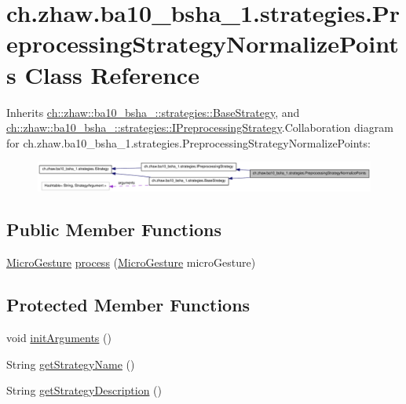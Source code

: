 \hypertarget{classch_1_1zhaw_1_1ba10__bsha__1_1_1strategies_1_1PreprocessingStrategyNormalizePoints}{
\section{ch.zhaw.ba10\_\-bsha\_\-1.strategies.PreprocessingStrategyNormalizePoints Class Reference}
\label{classch_1_1zhaw_1_1ba10__bsha__1_1_1strategies_1_1PreprocessingStrategyNormalizePoints}
}


Inherits \hyperlink{classch_1_1zhaw_1_1ba10__bsha__1_1_1strategies_1_1BaseStrategy}{ch::zhaw::ba10\_\-bsha\_::strategies::BaseStrategy}, and \hyperlink{interfacech_1_1zhaw_1_1ba10__bsha__1_1_1strategies_1_1IPreprocessingStrategy}{ch::zhaw::ba10\_\-bsha\_::strategies::IPreprocessingStrategy}.Collaboration diagram for ch.zhaw.ba10\_\-bsha\_\-1.strategies.PreprocessingStrategyNormalizePoints:\nopagebreak
\begin{figure}[H]
\begin{center}
\leavevmode
\includegraphics[width=400pt]{classch_1_1zhaw_1_1ba10__bsha__1_1_1strategies_1_1PreprocessingStrategyNormalizePoints__coll__graph}
\end{center}
\end{figure}
\subsection*{Public Member Functions}
\begin{DoxyCompactItemize}
\item 
\hyperlink{classch_1_1zhaw_1_1ba10__bsha__1_1_1service_1_1MicroGesture}{MicroGesture} \hyperlink{classch_1_1zhaw_1_1ba10__bsha__1_1_1strategies_1_1PreprocessingStrategyNormalizePoints_a0b7ffa8b9a2f6d98a2b871fc4afa39f9}{process} (\hyperlink{classch_1_1zhaw_1_1ba10__bsha__1_1_1service_1_1MicroGesture}{MicroGesture} microGesture)
\end{DoxyCompactItemize}
\subsection*{Protected Member Functions}
\begin{DoxyCompactItemize}
\item 
void \hyperlink{classch_1_1zhaw_1_1ba10__bsha__1_1_1strategies_1_1PreprocessingStrategyNormalizePoints_a0c81b7ac2ba72e201512d5f6de524e14}{initArguments} ()
\item 
String \hyperlink{classch_1_1zhaw_1_1ba10__bsha__1_1_1strategies_1_1PreprocessingStrategyNormalizePoints_ac9826f8ef875b62955887e6f3ffe7cff}{getStrategyName} ()
\item 
String \hyperlink{classch_1_1zhaw_1_1ba10__bsha__1_1_1strategies_1_1PreprocessingStrategyNormalizePoints_a9b2a647c2f4d9702d943dbe8ef43485e}{getStrategyDescription} ()
\end{DoxyCompactItemize}
